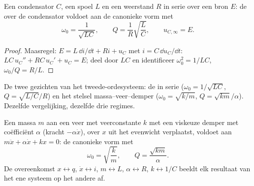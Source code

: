 \begin{proposition}\label{prop:b1:transient-regimes:rlc}
Een condensator $C$, een spoel $L$ en een weerstand $R$ in serie over een bron
$E$: de  over de condensator voldoet aan de canonieke vorm met
\[
\omega_0 = \frac{1}{\sqrt{LC}}, \qquad Q = \frac{1}{R}\sqrt{\frac{L}{C}},
\qquad u_{C,\infty} = E .
\]
\end{proposition}

\begin{proof}
Maasregel: $E = L\,\dd i/\dd t + Ri + u_C$ met $i = C\,\dd u_C/\dd t$:
$LC\,u_C'' + RC\,u_C' + u_C = E$; deel door $LC$ en identificeer
$\omega_0^2 = 1/LC$, $\omega_0/Q = R/L$.
\end{proof}

\begin{omfigure}

{\small De twee gezichten van het tweede-ordesysteem: de  in
serie ($\omega_0 = 1/\sqrt{LC}$, $Q = \sqrt{L/C}/R$) en het stelsel
massa--veer--demper ($\omega_0 = \sqrt{k/m}$, $Q = \sqrt{km}/\alpha$).
Dezelfde vergelijking, dezelfde drie regimes.}
\end{omfigure}

\begin{proposition}\label{prop:b1:transient-regimes:mechanical}
Een massa $m$ aan een veer met veerconstante $k$ met een viskeuze demper met
coëfficiënt $\alpha$ (kracht $-\alpha\dot x$), over $x$ uit het evenwicht
verplaatst, voldoet aan $m\ddot x + \alpha\dot x + kx = 0$: de canonieke vorm
met
\[
\omega_0 = \sqrt{\frac{k}{m}}, \qquad Q = \frac{\sqrt{km}}{\alpha} .
\]
De overeenkomst $x \leftrightarrow q$, $\dot x \leftrightarrow i$,
$m \leftrightarrow L$, $\alpha \leftrightarrow R$, $k \leftrightarrow 1/C$
beeldt elk resultaat van het ene systeem op het andere af.
\end{proposition}

